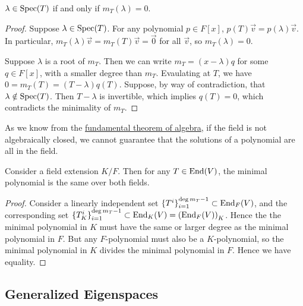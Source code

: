 \begin{lemma}\label{lem:eigenvalue-min-poly}
    \(\lambda \in \operatorname{Spec}(T)\) if and only if \(m_T(\lambda) = 0\).
\end{lemma}
\begin{proof}
    Suppose \(\lambda \in \operatorname{Spec}(T)\).
    For any polynomial \(p \in F[x]\),
    \(p(T)\vec{v} = p(\lambda)\vec{v}\).
    In particular, \(m_T(\lambda)\vec{v} = m_T(T)\vec{v} = \vec{0}\) for all \(\vec{v}\),
    so \(m_T(\lambda) = 0\).

    Suppose \(\lambda\) is a root of \(m_T\).
    Then we can write \(m_T = (x-\lambda)q\) for some \(q \in F[x]\),
    with a smaller degree than \(m_T\).
    Evaulating at \(T\), we have \(0 = m_T(T) = (T-\lambda)q(T)\).
    Suppose, by way of contradiction, that \(\lambda \notin \operatorname{Spec}(T)\).
    Then \(T-\lambda\) is invertible, which implies \(q(T) = 0\),
    which contradicts the minimality of \(m_T\).
\end{proof}
\begin{remark}
    As we know from the \hyperref[thm:fta]{fundamental theorem of algebra},
    if the field is not algebraically closed,
    we cannot guarantee that the solutions of a polynomial are all in the field.
\end{remark}
\begin{corollary}
    Consider a field extension \(K/F\).
    Then for any \(T \in \operatorname{End}(V)\),
    the minimal polynomial is the same over both fields.
\end{corollary}
\begin{proof}
    Consider a linearly independent set \({\{T^i\}}_{i=1}^{\deg m_T - 1} \subset \operatorname{End}_F(V)\),
    and the corresponding set \({\{T_K^i\}}_{i=1}^{\deg m_T - 1} \subset \End_K(V) = \pqty{\End_F(V)}_K\).
    Hence the the minimal polynomial in \(K\) must have the same or larger degree
    as the minimal polynomial in \(F\).
    But any \(F\)-polynomial must also be a \(K\)-polynomial,
    so the minimal polynomial in \(K\) divides the minimal polynomial in \(F\).
    Hence we have equality.
\end{proof}

\subsection*{Generalized Eigenspaces}

